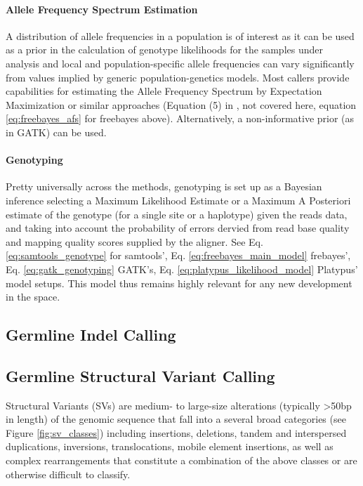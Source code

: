 \paragraph{Allele Frequency Spectrum Estimation}

A distribution of allele frequencies in a population is of interest as it can be used as a prior in the calculation of genotype likelihoods for the samples under analysis and local and population-specific allele frequencies can vary significantly from values implied by generic population-genetics models. Most callers provide capabilities for estimating the Allele Frequency Spectrum by Expectation Maximization or similar approaches (Equation (5) in \autocite{li2011statistical}, not covered here, equation \ref{eq:freebayes_afs} for freebayes above). Alternatively, a non-informative prior (as in GATK) can be used.

\paragraph{Genotyping}

Pretty universally across the methods, genotyping is set up as a Bayesian inference selecting a Maximum Likelihood Estimate or a Maximum A Posteriori estimate of the genotype (for a single site or a haplotype) given the reads data, and taking into account the probability of errors dervied from read base quality and mapping quality scores supplied by the aligner. See Eq. \ref{eq:samtools_genotype} for samtools', Eq. \ref{eq:freebayes_main_model} frebayes', Eq. \ref{eq:gatk_genotyping} GATK's, Eq. \ref{eq:platypus_likelihood_model} Platypus' model setups. This model thus remains highly relevant for any new development in the space. 



\subsection{Germline Indel Calling}




\subsection{Germline Structural Variant Calling}
\label{sec:bg_germline_sv_calling}

Structural Variants (SVs) are medium- to large-size alterations (typically >50bp in length) of the genomic sequence that fall into a several broad categories (see Figure \ref{fig:sv_classes}) including insertions, deletions, tandem and interspersed duplications, inversions, translocations, mobile element insertions, as well as complex rearrangements that constitute a combination of the above classes or are otherwise difficult to classify. 

